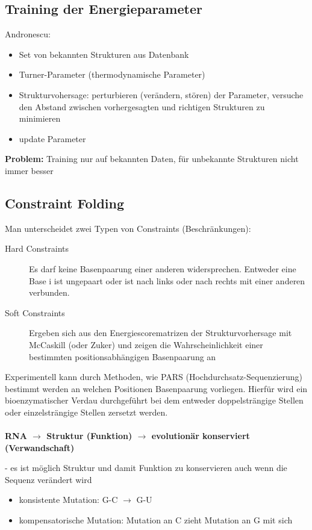 \subsection{Training der Energieparameter}
Andronescu:
\begin{itemize}
	\item Set von bekannten Strukturen aus Datenbank
	\item Turner-Parameter (thermodynamische Parameter)
	\item Strukturvohersage: perturbieren (verändern, stören) der Parameter, versuche den Abstand zwischen vorhergesagten und richtigen Strukturen zu minimieren
	\item update Parameter
\end{itemize}

\textbf{Problem:} Training nur auf bekannten Daten, für unbekannte Strukturen nicht immer besser

\subsection{Constraint Folding}
Man unterscheidet zwei Typen von Constraints (Beschränkungen):
\begin{description}
\item[Hard Constraints] Es darf keine Basenpaarung einer anderen widersprechen. Entweder eine Base i ist ungepaart oder ist nach links oder nach rechts mit einer anderen verbunden. 
\item[Soft Constraints] Ergeben sich aus den Energiescorematrizen der Strukturvorhersage mit McCaskill (oder Zuker) und zeigen die Wahrscheinlichkeit einer bestimmten positionsabhängigen Basenpaarung an
\end{description}

Experimentell kann durch Methoden, wie PARS (Hochdurchsatz-Sequenzierung) bestimmt werden an welchen Positionen Basenpaarung vorliegen. Hierfür wird ein bioenzymatischer Verdau durchgeführt bei dem entweder doppelsträngige Stellen oder einzelsträngige Stellen zersetzt werden.
\\\\
\textbf{RNA $\rightarrow$ Struktur (Funktion) $\rightarrow$ evolutionär konserviert (Verwandschaft)}

- es ist möglich Struktur und damit Funktion zu konservieren auch wenn die Sequenz verändert wird

\begin{itemize}
	\item konsistente Mutation: G-C $\rightarrow$ G-U
	\item kompensatorische Mutation: Mutation an C zieht Mutation an G mit sich
\end{itemize}

